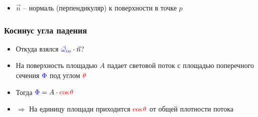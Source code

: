 \documentclass[10pt]{beamer}
\begin{document}
\begin{frame}[fragile]
\begin{itemize}
\pause
\item \begin{math}\vec n\end{math} -- нормаль (перпендикуляр) к поверхности в точке \begin{math}p\end{math}
\end{itemize}
\end{frame}

\begin{frame}[fragile]
\frametitle{Косинус угла падения}
\begin{itemize}
\item Откуда взялся \begin{math}{\color{blue}\vec\omega_{in}} \cdot \vec{n}\end{math}?
\pause
\item На поверхность площадью \begin{math}A\end{math} падает световой поток с площадью поперечного сечения \begin{math}{\color{blue} \Phi}\end{math} под углом \begin{math}\color{red}\theta\end{math}
\item Тогда \begin{math}{\color{blue} \Phi} = A \cdot {\color{red} \cos \theta}\end{math}
\item \begin{math}\Rightarrow\end{math} На единицу площади приходится \begin{math}{\color{red}\cos \theta}\end{math} от общей плотности потока
\end{itemize}
\begin{center}
\end{center}
\end{frame}
\end{document}
